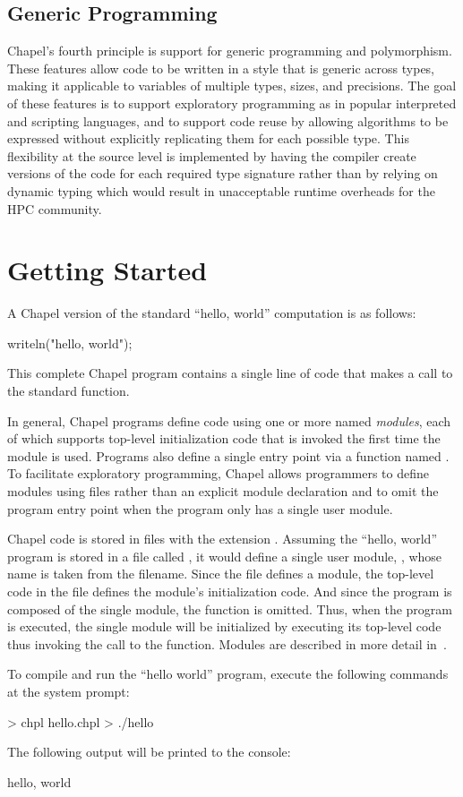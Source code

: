 \subsection{Generic Programming}
\label{Generic_Programming}

Chapel's fourth principle is support for generic programming and
polymorphism.  These features allow code to be written in a style that
is generic across types, making it applicable to variables of multiple
types, sizes, and precisions.  The goal of these features is to
support exploratory programming as in popular interpreted and
scripting languages, and to support code reuse by allowing algorithms
to be expressed without explicitly replicating them for each possible
type.  This flexibility at the source level is implemented by having
the compiler create versions of the code for each required type
signature rather than by relying on dynamic typing which would result
in unacceptable runtime overheads for the HPC community.

\section{Getting Started}
\label{Getting_Started}

A Chapel version of the standard ``hello, world'' computation is as
follows:
\vspace{0.5pc}
\begin{chapel}
writeln("hello, world");
\end{chapel}
This complete Chapel program contains a single line of code that makes
a call to the standard  function.


In general, Chapel programs define code using one or more named
\emph{modules}, each of which supports top-level initialization code
that is invoked the first time the module is used.  Programs also
define a single entry point via a function named .  To
facilitate exploratory programming, Chapel allows programmers to
define modules using files rather than an explicit module declaration
and to omit the program entry point when the program only has a single
user module.

Chapel code is stored in files with the extension .
Assuming the ``hello, world'' program is stored in a file
called , it would define a single user
module, , whose name is taken from the filename.  Since
the file defines a module, the top-level code in the file defines the
module's initialization code.  And since the program is composed of
the single  module, the  function is omitted.
Thus, when the program is executed, the single  module
will be initialized by executing its top-level code thus invoking the
call to the  function.  Modules are described in more
detail in~.

To compile and run the ``hello world'' program, execute the following
commands at the system prompt:
\begin{commandline} 
> chpl hello.chpl
> ./hello
\end{commandline}
The following output will be printed to the console:
\begin{commandline}
hello, world
\end{commandline}
